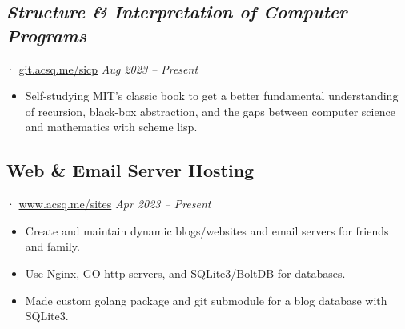 \documentclass[12pt]{article}
\newcommand{\itemspace}{\vspace{0.1870em}}
\renewcommand{\textsc}[1]{\uppercase{\footnotesize#1}\normalsize}
\begin{document}
\subsection{\textit{Structure \& Interpretation of Computer Programs}} ·
\href{https://git.acsq.me/sicp/about/}{git.acsq.me/sicp}
\hfill \textit{Aug 2023 -- Present}

\begin{itemize}[noitemsep,nolistsep]
  \item Self-studying MIT's classic book to get a better fundamental
    understanding of recursion, black-box abstraction, and the gaps between computer
    science and mathematics with scheme lisp.
\end{itemize}

\itemspace

\subsection{Web \& Email Server Hosting} ·
\href{https://www.acsq.me/sites}{www.acsq.me/sites}
\hfill \textit{Apr 2023 -- Present}

\begin{itemize}[noitemsep,nolistsep]
  \item Create and maintain dynamic blogs/websites and email servers for
    friends and family.

  \item Use Nginx, \textsc{go} http servers, and SQLite3/BoltDB for databases.

  \item Made custom golang package and git submodule for a blog database with SQLite3.
\end{itemize}

\itemspace

\end{document}
